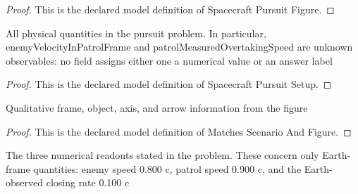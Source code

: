 \begin{proof}
  This is the declared model definition of Spacecraft Pursuit Figure.
\end{proof}
\begin{definition}
  \label{def:physics:phyx-mini-0527:phyxminiproblems-problemphyxmini0527-spacecraftpursuitsetup}
  All physical quantities in the pursuit problem. In particular, enemyVelocityInPatrolFrame and patrolMeasuredOvertakingSpeed are unknown observables: no field assigns either one a numerical value or an answer label
\end{definition}
\begin{proof}
  This is the declared model definition of Spacecraft Pursuit Setup.
\end{proof}
\begin{definition}
  \label{def:physics:phyx-mini-0527:phyxminiproblems-problemphyxmini0527-matchesscenarioandfigure}
  Qualitative frame, object, axis, and arrow information from the figure
\end{definition}
\begin{proof}
  This is the declared model definition of Matches Scenario And Figure.
\end{proof}
\begin{definition}
  \label{def:physics:phyx-mini-0527:phyxminiproblems-problemphyxmini0527-matchesproblemreadouts}
  The three numerical readouts stated in the problem. These concern only Earth-frame quantities: enemy speed 0.800 c, patrol speed 0.900 c, and the Earth-observed closing rate 0.100 c
\end{definition}
